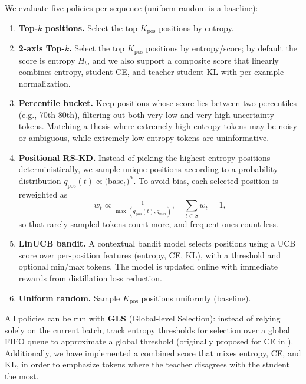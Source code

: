 \documentclass[11pt]{article}
\begin{document}
We evaluate five policies per sequence (uniform random is a baseline):
\begin{enumerate}
	\item \textbf{Top-$k$ positions.} Select the top $K_{\text{pos}}$ positions by entropy.
	\item \textbf{2-axis Top-$k$.} Select the top $K_{\text{pos}}$ positions by entropy/score; by default the score is entropy $H_t$, and we also support a composite score that linearly combines entropy, student CE, and teacher-student KL with per-example normalization.
	\item \textbf{Percentile bucket.} Keep positions whose score lies between two percentiles (e.g., 70th-80th), filtering out both very low and very high-uncertainty tokens. Matching a thesis where extremely high-entropy tokens may be noisy or ambiguous, while extremely low-entropy tokens are uninformative.
	\item \textbf{Positional RS-KD.} Instead of picking the highest-entropy positions deterministically, we sample unique positions according to a probability distribution $q_{\text{pos}}(t)\propto \big(\text{base}_t\big)^{\alpha}$. To avoid bias, each selected position is reweighted as
	      \[
		      w_t \propto  \tfrac{1}{\max(q_{\text{pos}}(t),q_{\min})},\quad \sum_{t\in S}w_t=1,
	      \]
	      so that rarely sampled tokens count more, and frequent ones count less.
	\item \textbf{LinUCB bandit.} A contextual bandit model selects positions using a UCB score over per-position features (entropy, CE, KL), with a threshold and optional min/max tokens. The model is updated online with immediate rewards from distillation loss reduction.
	\item \textbf{Uniform random.} Sample $K_{\text{pos}}$ positions uniformly (baseline).
\end{enumerate}
All policies can be run with \textbf{GLS} (Global-level Selection): instead of relying solely on the current batch, track entropy thresholds for selection over a global FIFO queue to approximate a global threshold (originally proposed for CE in \citet{wang2021selectivekd}).
Additionally, we have implemented a combined score that mixes entropy, CE, and KL, in order to emphasize tokens where the teacher disagrees with the student the most.
\end{document}
